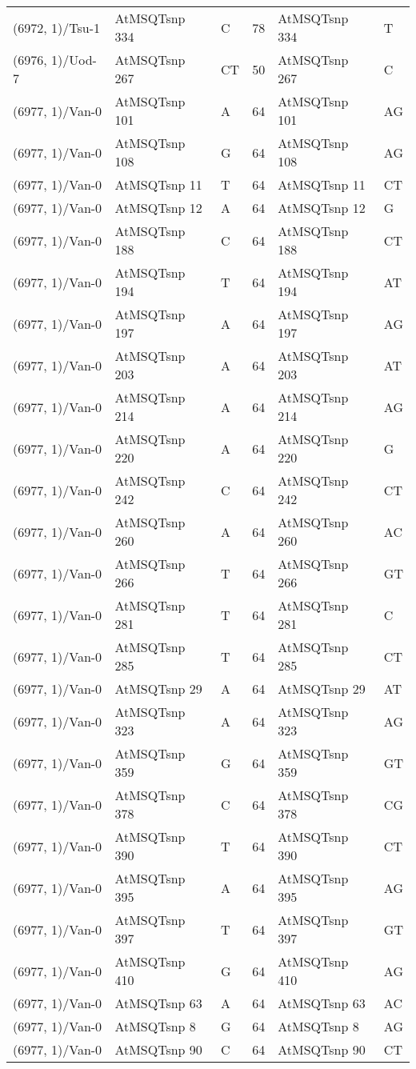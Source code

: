 \begin{center}
\begin{longtable}{|l|l|l|l|l|l|}
(6972, 1)/Tsu-1&AtMSQTsnp 334&C&78&AtMSQTsnp 334&T\\
(6976, 1)/Uod-7&AtMSQTsnp 267&CT&50&AtMSQTsnp 267&C\\
(6977, 1)/Van-0&AtMSQTsnp 101&A&64&AtMSQTsnp 101&AG\\
(6977, 1)/Van-0&AtMSQTsnp 108&G&64&AtMSQTsnp 108&AG\\
(6977, 1)/Van-0&AtMSQTsnp 11&T&64&AtMSQTsnp 11&CT\\
(6977, 1)/Van-0&AtMSQTsnp 12&A&64&AtMSQTsnp 12&G\\
(6977, 1)/Van-0&AtMSQTsnp 188&C&64&AtMSQTsnp 188&CT\\
(6977, 1)/Van-0&AtMSQTsnp 194&T&64&AtMSQTsnp 194&AT\\
(6977, 1)/Van-0&AtMSQTsnp 197&A&64&AtMSQTsnp 197&AG\\
(6977, 1)/Van-0&AtMSQTsnp 203&A&64&AtMSQTsnp 203&AT\\
(6977, 1)/Van-0&AtMSQTsnp 214&A&64&AtMSQTsnp 214&AG\\
(6977, 1)/Van-0&AtMSQTsnp 220&A&64&AtMSQTsnp 220&G\\
(6977, 1)/Van-0&AtMSQTsnp 242&C&64&AtMSQTsnp 242&CT\\
(6977, 1)/Van-0&AtMSQTsnp 260&A&64&AtMSQTsnp 260&AC\\
(6977, 1)/Van-0&AtMSQTsnp 266&T&64&AtMSQTsnp 266&GT\\
(6977, 1)/Van-0&AtMSQTsnp 281&T&64&AtMSQTsnp 281&C\\
(6977, 1)/Van-0&AtMSQTsnp 285&T&64&AtMSQTsnp 285&CT\\
(6977, 1)/Van-0&AtMSQTsnp 29&A&64&AtMSQTsnp 29&AT\\
(6977, 1)/Van-0&AtMSQTsnp 323&A&64&AtMSQTsnp 323&AG\\
(6977, 1)/Van-0&AtMSQTsnp 359&G&64&AtMSQTsnp 359&GT\\
(6977, 1)/Van-0&AtMSQTsnp 378&C&64&AtMSQTsnp 378&CG\\
(6977, 1)/Van-0&AtMSQTsnp 390&T&64&AtMSQTsnp 390&CT\\
(6977, 1)/Van-0&AtMSQTsnp 395&A&64&AtMSQTsnp 395&AG\\
(6977, 1)/Van-0&AtMSQTsnp 397&T&64&AtMSQTsnp 397&GT\\
(6977, 1)/Van-0&AtMSQTsnp 410&G&64&AtMSQTsnp 410&AG\\
(6977, 1)/Van-0&AtMSQTsnp 63&A&64&AtMSQTsnp 63&AC\\
(6977, 1)/Van-0&AtMSQTsnp 8&G&64&AtMSQTsnp 8&AG\\
(6977, 1)/Van-0&AtMSQTsnp 90&C&64&AtMSQTsnp 90&CT\\

\end{longtable}
\end{center}
